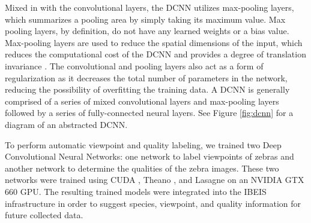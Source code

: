 Mixed in with the convolutional layers, the DCNN utilizes max-pooling layers, which summarizes a pooling area by simply taking its maximum value.  Max pooling layers, by definition, do not have any learned weights or a bias value.   Max-pooling layers are used to reduce the spatial dimensions of the input, which reduces the computational cost of the DCNN and provides a degree of translation invariance \cite{lee_convolutional_2009, riesenhuber_models_2000}.  The convolutional and pooling layers also act as a form of regularization as it decreases the total number of parameters in the network, reducing the possibility of overfitting the training data.  A DCNN is generally comprised of a series of mixed convolutional layers and max-pooling layers followed by a series of fully-connected neural layers.  See Figure \ref{fig:dcnn} for a diagram of an abstracted DCNN.

To perform automatic viewpoint and quality labeling, we trained two Deep Convolutional Neural Networks: one network to label viewpoints of zebras and another network to determine the qualities of the zebra images.  These two networks were trained using CUDA \cite{nickolls_scalable_2008}, Theano \cite{bastien_theano:_2012, bergstra_theano:_2010}, and Lasagne \cite{dieleman_lasagne:_2015} on an NVIDIA GTX 660 GPU.  The resulting trained models were integrated into the IBEIS infrastructure in order to suggest species, viewpoint, and quality information for future collected data.

